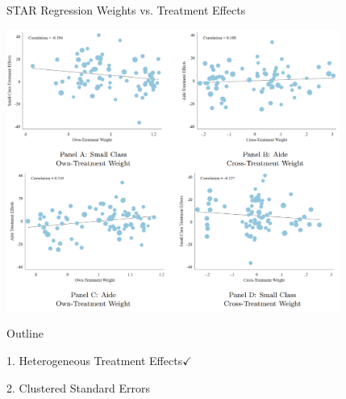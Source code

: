 \documentclass[11pt,english]{beamer}
\begin{document}
\begin{frame}{STAR Regression Weights vs. Treatment Effects}
\vspace{0.1cm}
\begin{center}
	\includegraphics[width=0.82\textwidth]{figures/STAR_Scatter.png}
\end{center}

\end{frame}

\begin{frame}{Outline}

\textcolor{red!75!green!50!blue!25!gray}{1. Heterogeneous Treatment Effects}$\checkmark$
\vspace{0.8cm}

2. Clustered Standard Errors

\end{frame}
\end{document}
